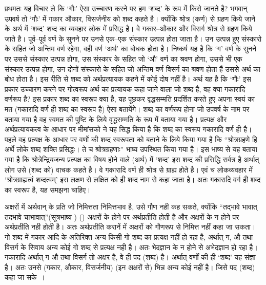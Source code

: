प्रथमतः यह विचार ले कि ‘गौः' ऐसा उच्चारण करने पर हम ‘शब्द' के रूप में किसे जानते है? भगवान् उपवर्ष तो ‘गौः' में गकार औकार, विसर्जनीय को शब्द कहते है। क्योंकि श्रोत्र (कर्ण) से ग्रहण किये जाने के अर्थ में ‘शब्द' शब्द का व्यवहार लोक में प्रसिद्ध है। वे गकार–औकार और विसर्ग श्रोत्र से ग्रहण किये जाते है। पूर्व–पूर्व वर्ण के सुनने पर उनसे एक–एक संस्कार उत्पन्न होता जाता है। उन उत्पन्न हुए संस्कारो के सहित जो अन्तिम वर्ण रहेगा, वही वर्ण ‘अर्थ' का बोधक होता है। निष्कर्ष यह है कि ‘ग' वर्ण के सुनने पर उससे संस्कार उत्पन्न होगा, उस संस्कार के सहित जो ‘औ' वर्ण का श्रवण होगा, उससे भी एक संस्कार उत्पन्न होगा, उन दोनों संस्कारो के सहित जो अन्तिम वर्ण विसर्ग का श्रवण होता हैं उससे अर्थ का बोध होता है। इस रीति से शब्द को अर्थप्रत्यायक कहने में कोई दोष नहीं है। अर्थ यह है कि ‘गौः' इस प्रकार उच्चारण करने पर गोत्वरूप अर्थ का प्रत्यायक कहा जाने वाला जो शब्द है, वह क्या गकारादि वर्णरूप है? इस प्रकार शब्द का स्वरूप क्या है, यह पूछकर वृद्धसम्मति प्रदर्शित करते हुए अपना स्वयं का मत (गकारादि वर्ण ही शब्द का स्वरूप है) ऐसा बतायेंगे। शब्द का वर्णरूप होना जो उपवर्ष के नाम पर बताया गया है वह स्वमत की पुष्टि के लिये वृद्धसम्मति के रूप में बताया गया है। प्रत्यक्ष और अर्थप्रत्यायकत्व के आधार पर मीमांसको ने यह सिद्ध किया है कि शब्द का स्वरूप गकारादि वर्ण ही है। पहले वह प्रत्यक्ष के आधार पर वर्णो की शब्द स्वरूपता को बताने के लिये किया गया है कि “श्रोत्रग्रहणे हि अर्थे लोके शब्द शक्ति प्रसिद्धः। ते च श्रोत्रग्रहणाः” भाष्य उपस्थित किया गया है। इस भाष्य से यह बताया गया हैै कि श्रोत्रेन्द्रियजन्य प्रत्यक्ष का विषय होने वाले (अर्थ) में ‘शब्द' इस शब्द की प्रसिद्धि सर्वत्र है अर्थात् लोग उसे (शब्द को) वाचक कहते है। वे गकारादि वर्ण ही श्रोत्र से ग्राह्य होते है। एवं च लोकव्यवहार में ‘श्रोत्रग्राह्यत्वं शब्दत्वम्' इस लक्षण से लक्षित को ही शब्द नाम से कहा जाता है। अतः गकारादि वर्ग ही शब्द का स्वरूप है, यह समझना चाहिए। 

अक्षरों में अर्थवान् के प्रति जो निमित्तता निमित्तभाव है, उसे गौण नही कह सकते, क्योंकि “तद्भावे भावात् तदभावे चाभावात्”(सूत्रभाष्य ) () अक्षरों के होने पर अर्थप्रतीति होती है और अक्षरों के न होने पर अर्थप्रतीति नही होती है। अतः अर्थप्रतीति करानें में अक्षरों को गौणरूप से निमित्त नहीं कहा जा सकता। गो शब्द में गकार आदि के अतिरिक्त अन्य किसी गो शब्द का प्रत्यक्ष नहीं हो रहा है, अर्थात् ग, औ तथा विसर्ग के सिवाय अन्य कोई गो शब्द से प्रत्यक्ष नही है। अतः भेदज्ञान के न होने से अभेदज्ञान हो रहा है। गकारादि अर्थात् ग औ तथा विसर्ग तो अक्षर है, वे ही पद (शब्द) है। अर्थात् वर्णों की ही ‘शब्द' यह संज्ञा है। अतः उनसे (गकार, औकार, विसर्जनीय) (इन अक्षरों से) भिन्न अन्य कोई नहीं है। जिसे पद (शब्द) कहा जा सके~। 


